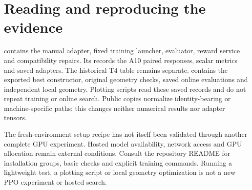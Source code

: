 \section{Reading and reproducing the evidence}
 contains the manual adapter, fixed training launcher, evaluator, reward service and compatibility repairs. Its  records the A10 paired responses, scalar metrics and saved adapters. The historical T4 table remains separate.  contains the exported best constructor, original geometry checks, saved online evaluations and independent local geometry. Plotting scripts read these saved records and do not repeat training or online search. Public copies normalize identity-bearing or machine-specific paths; this changes neither numerical results nor adapter tensors.

The fresh-environment setup recipe has not itself been validated through another complete GPU experiment. Hosted model availability, network access and GPU allocation remain external conditions. Consult the repository README for installation groups, basic checks and explicit training commands. Running a lightweight test, a plotting script or local geometry optimization is not a new PPO experiment or hosted search.
